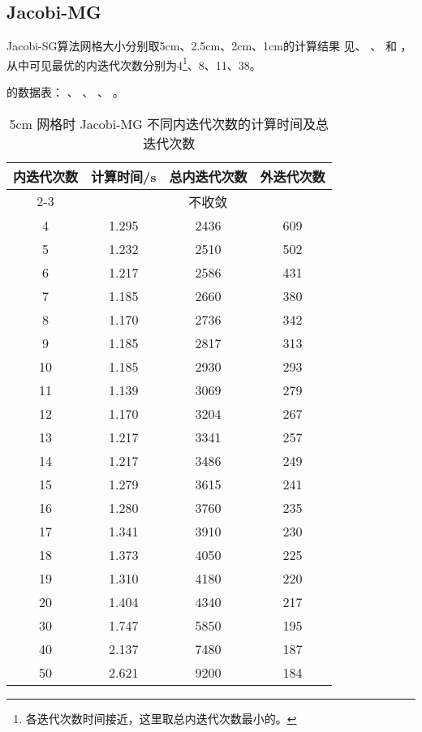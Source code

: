 \subsection{Jacobi-MG}
\label{sec:equsolve.iter.jacobi-mg}

Jacobi-SG算法网格大小分别取5cm、2.5cm、2cm、1cm的计算结果
见、%
、%
和%
，
从中可见最优的内迭代次数分别为4\footnote{各迭代次数时间接近，这里取总内迭代次数最小的。}、8、11、38。

\begin{datasheet}
的数据表：
、
、
、
。

\begin{table}
\centering
\caption{5cm 网格时 Jacobi-MG 不同内迭代次数的计算时间及总迭代次数}
\label{tab:equsolve.iter.jacobi-mg.5cm}
\begin{tabular}{cccc}
\toprule
内迭代次数 & 计算时间/s & 总内迭代次数 & 外迭代次数\\
\midrule
2-3 & \multicolumn{3}{c}{不收敛} \\ %
4 & 1.295 & 2436 & 609\\
5 & 1.232 & 2510 & 502\\
6 & 1.217 & 2586 & 431\\
7 & 1.185 & 2660 & 380\\
8 & 1.170 & 2736 & 342\\
9 & 1.185 & 2817 & 313\\
10 & 1.185 & 2930 & 293\\
11 & 1.139 & 3069 & 279\\
12 & 1.170 & 3204 & 267\\
13 & 1.217 & 3341 & 257\\
14 & 1.217 & 3486 & 249\\
15 & 1.279 & 3615 & 241\\
16 & 1.280 & 3760 & 235\\
17 & 1.341 & 3910 & 230\\
18 & 1.373 & 4050 & 225\\
19 & 1.310 & 4180 & 220\\
20 & 1.404 & 4340 & 217\\
30 & 1.747 & 5850 & 195\\
40 & 2.137 & 7480 & 187\\
50 & 2.621 & 9200 & 184\\
\bottomrule
\end{tabular}
\end{table}


\end{datasheet}
